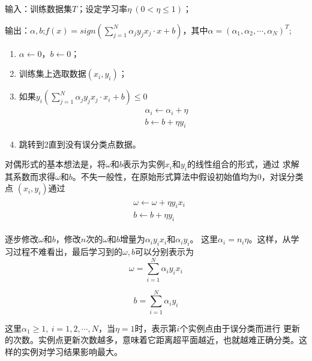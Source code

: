 \begin{framed}
输入：训练数据集$T$；设定学习率$\eta\ (0<\eta\leqslant 1)$；

输出：$\alpha,b$;$f(x)=sign(\sum_{j=1}^{N}\alpha_jy_jx_j\cdot x+b)$，其中$\alpha=(\alpha_1,\alpha_2,\cdots,\alpha_N)^T$;

\begin{enumerate}[itemindent=1em]
    \item $\alpha \leftarrow 0$，$b\leftarrow 0$；
    \item 训练集上选取数据$(x_i,y_i)$；
    \item 如果$y_i(\sum_{j=1}^{N}\alpha_jy_jx_j\cdot x_i+b)\leqslant 0$
    \begin{equation}
        \begin{aligned}
            & \alpha_i\leftarrow \alpha_i+\eta\\
            & b\leftarrow b+\eta y_i
        \end{aligned}
    \end{equation}

    \item 跳转到2直到没有误分类点数据。
\end{enumerate}
    
\end{framed}

对偶形式的基本想法是，将$\omega$和$b$表示为实例$x_i$和$y_i$的线性组合的形式，通过
求解其系数而求得$\omega$和$b$。不失一般性，在原始形式算法中假设初始值均为0，对误分类点
$(x_i,y_i)$通过
\begin{eqnarray}
    \begin{aligned}
        & \omega \leftarrow \omega +\eta y_i x_i\\
        & b\leftarrow b+\eta y_i
    \end{aligned}
\end{eqnarray}

逐步修改$\omega$和$b$，修改$n$次的$\omega$和$b$增量为$\alpha_iy_ix_i$和$\alpha_iy_i$。
这里$\alpha_i=n_i\eta$。这样，从学习过程不难看出，最后学习到的$\omega,b$可以分别表示为
\begin{equation}
    \omega = \sum_{i=1}^{N} \alpha_iy_ix_i
\end{equation}

\begin{equation}
    b=\sum_{i=1}^{N} \alpha_iy_i
\end{equation}

这里$\alpha_1\geqslant 1,\ i=1,2,\cdots,N$，当$\eta=1$时，表示第$i$个实例点由于误分类而进行
更新的次数。实例点更新次数越多，意味着它距离超平面越近，也就越难正确分类。这样的实例对学习结果影响最大。

